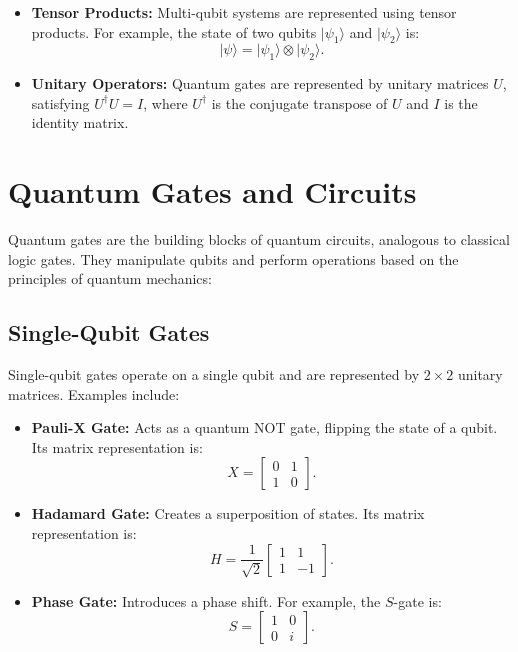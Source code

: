 \documentclass[12pt,a4paper]{report}
\begin{document}
\begin{itemize}
    \item \textbf{Tensor Products:} Multi-qubit systems are represented using tensor products. For example, the state of two qubits \( |\psi_1\rangle \) and \( |\psi_2\rangle \) is:
    \[
    |\psi\rangle = |\psi_1\rangle \otimes |\psi_2\rangle.
    \]

    \item \textbf{Unitary Operators:} Quantum gates are represented by unitary matrices \( U \), satisfying \( U^\dagger U = I \), where \( U^\dagger \) is the conjugate transpose of \( U \) and \( I \) is the identity matrix.
\end{itemize}

\section{Quantum Gates and Circuits}
Quantum gates are the building blocks of quantum circuits, analogous to classical logic gates. They manipulate qubits and perform operations based on the principles of quantum mechanics:

\subsection{Single-Qubit Gates}
Single-qubit gates operate on a single qubit and are represented by \( 2 \times 2 \) unitary matrices. Examples include:
\begin{itemize}
    \item \textbf{Pauli-X Gate:} Acts as a quantum NOT gate, flipping the state of a qubit. Its matrix representation is:
    \[
    X = \begin{bmatrix}
    0 & 1 \\
    1 & 0
    \end{bmatrix}.
    \]
    \item \textbf{Hadamard Gate:} Creates a superposition of states. Its matrix representation is:
    \[
    H = \frac{1}{\sqrt{2}} \begin{bmatrix}
    1 & 1 \\
    1 & -1
    \end{bmatrix}.
    \]
    \item \textbf{Phase Gate:} Introduces a phase shift. For example, the \( S \)-gate is:
    \[
    S = \begin{bmatrix}
    1 & 0 \\
    0 & i
    \end{bmatrix}.
    \]
\end{itemize}
\end{document}
